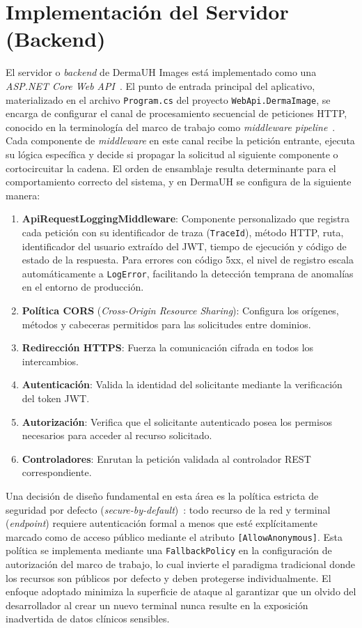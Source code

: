 \section{Implementación del Servidor (Backend)}
El servidor o \textit{backend} de DermaUH Images está implementado como una 
\textit{ASP.NET Core Web API}~\cite{aspnet_core_docs}. 
El punto de entrada principal del aplicativo, materializado en el archivo \texttt{Program.cs} del 
proyecto \texttt{WebApi.DermaImage}, se encarga de configurar el canal de procesamiento secuencial de 
peticiones HTTP, conocido en la terminología del marco de trabajo como 
\textit{middleware pipeline}~\cite{aspnet_middleware_docs}. Cada componente de \textit{middleware} en este 
canal recibe la petición entrante, ejecuta su lógica específica y decide si propagar la solicitud al 
siguiente componente o cortocircuitar la cadena. El orden de ensamblaje resulta determinante para el 
comportamiento correcto del sistema, y en DermaUH se configura de la siguiente manera:

\begin{enumerate}
    \item \textbf{ApiRequestLoggingMiddleware}: Componente personalizado que registra cada petición con 
    su identificador de traza (\texttt{TraceId}), método HTTP, ruta, identificador del usuario extraído 
    del JWT, tiempo de ejecución y código de estado de la respuesta. Para errores con código 5xx, el nivel 
    de registro escala automáticamente a \texttt{LogError}, facilitando la detección temprana de anomalías 
    en el entorno de producción.
    \item \textbf{Política CORS} (\textit{Cross-Origin Resource Sharing}): Configura los orígenes, métodos 
    y cabeceras permitidos para las solicitudes entre dominios.
    \item \textbf{Redirección HTTPS}: Fuerza la comunicación cifrada en todos los intercambios.
    \item \textbf{Autenticación}: Valida la identidad del solicitante mediante la verificación del 
    token JWT.
    \item \textbf{Autorización}: Verifica que el solicitante autenticado posea los permisos necesarios 
    para acceder al recurso solicitado.
    \item \textbf{Controladores}: Enrutan la petición validada al controlador REST correspondiente.
\end{enumerate}

Una decisión de diseño fundamental en esta área es la política estricta de seguridad por 
defecto (\textit{secure-by-default})~\cite{owasp_secure_default}: todo recurso de la red y 
terminal (\textit{endpoint}) requiere autenticación formal a menos que esté explícitamente marcado 
como de acceso público mediante el atributo \texttt{[AllowAnonymous]}. Esta política se implementa 
mediante una \texttt{FallbackPolicy} en la configuración de autorización del marco de trabajo, lo 
cual invierte el paradigma tradicional donde los recursos son públicos por defecto y deben protegerse 
individualmente. El enfoque adoptado minimiza la superficie de ataque al garantizar que un olvido del 
desarrollador al crear un nuevo terminal nunca resulte en la exposición inadvertida de datos clínicos 
sensibles.

